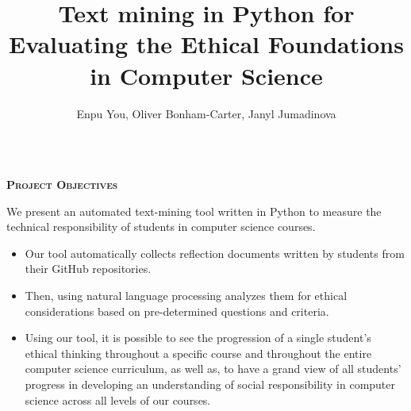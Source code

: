 \documentclass[final,t]{beamer}
\title[]{Text mining in Python for Evaluating the Ethical Foundations in Computer Science}
\author[Bonham-Carter]{Enpu You, Oliver Bonham-Carter, Janyl Jumadinova}
\institute{Depts of Computer Science, Allegheny College \\ Meadville, PA}
\begin{document}
    \begin{frame}{}
        \vspace*{2mm}
        \begin{columns}[t]
        	\begin{column}{1\linewidth}
%
%

%
%
                \begin{block}{\textsc{\textbf{Project Objectives}}}
				\vspace*{3mm}

                        We present an automated text-mining tool written in Python to measure the technical responsibility of students in computer science courses.

				\begin{itemize}
					\item Our tool automatically collects reflection documents written by students from their GitHub repositories.
					\item Then, using natural language processing analyzes them for ethical considerations based on pre-determined questions and criteria. 
					\item Using our tool, it is possible to see the progression of a single student's ethical thinking throughout a specific course and throughout the entire computer science curriculum, as well as, to have a grand view of all students' progress in developing an understanding of social responsibility in computer science across all levels of our courses. 


\end{itemize}
\end{block}
\end{column}
\end{columns}
\end{frame}
\end{document}
